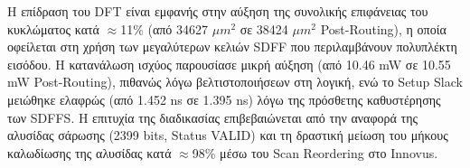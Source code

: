 Η επίδραση του DFT είναι εμφανής στην αύξηση της συνολικής επιφάνειας του κυκλώματος κατά $\approx$11\% (από 34627 $\mu m^2$ σε 38424 $\mu m^2$ Post-Routing), η οποία οφείλεται στη χρήση των μεγαλύτερων κελιών SDFF που περιλαμβάνουν πολυπλέκτη εισόδου. Η κατανάλωση ισχύος παρουσίασε μικρή αύξηση (από 10.46 mW σε 10.55 mW Post-Routing), πιθανώς λόγω βελτιστοποιήσεων στη λογική, ενώ το Setup Slack μειώθηκε ελαφρώς (από 1.452 ns σε 1.395 ns) λόγω της πρόσθετης καθυστέρησης των SDFFS. Η επιτυχία της διαδικασίας επιβεβαιώνεται από την αναφορά της αλυσίδας σάρωσης (2399 bits, Status VALID) και τη δραστική μείωση του μήκους καλωδίωσης της αλυσίδας κατά $\approx$98\% μέσω του Scan Reordering στο Innovus.